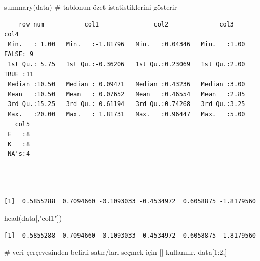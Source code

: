 \documentclass[
  letterpaper,
  DIV=11,
  numbers=noendperiod]{scrreprt}
\newenvironment{Shaded}{\begin{snugshade}}{\end{snugshade}}
\newcommand{\CommentTok}[1]{\textcolor[rgb]{0.37,0.37,0.37}{#1}}
\newcommand{\DecValTok}[1]{\textcolor[rgb]{0.68,0.00,0.00}{#1}}
\newcommand{\FunctionTok}[1]{\textcolor[rgb]{0.28,0.35,0.67}{#1}}
\newcommand{\NormalTok}[1]{\textcolor[rgb]{0.00,0.23,0.31}{#1}}
\newcommand{\SpecialCharTok}[1]{\textcolor[rgb]{0.37,0.37,0.37}{#1}}
\newcommand{\StringTok}[1]{\textcolor[rgb]{0.13,0.47,0.30}{#1}}
\begin{document}
\begin{Shaded}
\begin{Highlighting}[]
\FunctionTok{summary}\NormalTok{(data) }\CommentTok{\# tablonun özet istatistiklerini gösterir}
\end{Highlighting}
\end{Shaded}

\begin{verbatim}
    row_num           col1               col2              col3         col4   
 Min.   : 1.00   Min.   :-1.81796   Min.   :0.04346   Min.   :1.00   FALSE: 9  
 1st Qu.: 5.75   1st Qu.:-0.36206   1st Qu.:0.23069   1st Qu.:2.00   TRUE :11  
 Median :10.50   Median : 0.09471   Median :0.43236   Median :3.00             
 Mean   :10.50   Mean   : 0.07652   Mean   :0.46554   Mean   :2.85             
 3rd Qu.:15.25   3rd Qu.: 0.61194   3rd Qu.:0.74268   3rd Qu.:3.25             
 Max.   :20.00   Max.   : 1.81731   Max.   :0.96447   Max.   :5.00             
   col5  
 E   :8  
 K   :8  
 NA's:4  
         
         
         
\end{verbatim}

\begin{Shaded}
\end{Shaded}

\begin{verbatim}
[1]  0.5855288  0.7094660 -0.1093033 -0.4534972  0.6058875 -1.8179560
\end{verbatim}

\begin{Shaded}
\begin{Highlighting}[]
\FunctionTok{head}\NormalTok{(data[,}\StringTok{"col1"}\NormalTok{])}
\end{Highlighting}
\end{Shaded}

\begin{verbatim}
[1]  0.5855288  0.7094660 -0.1093033 -0.4534972  0.6058875 -1.8179560
\end{verbatim}

\begin{Shaded}
\begin{Highlighting}[]
\CommentTok{\# veri çerçevesinden belirli satır/ları seçmek için [] kullanılır.}
\NormalTok{data[}\DecValTok{1}\SpecialCharTok{:}\DecValTok{2}\NormalTok{,] }
\end{Highlighting}
\end{Shaded}
\end{document}
